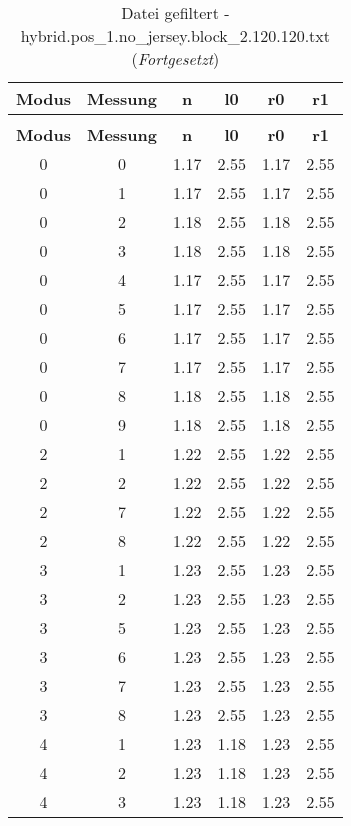 \begin{longtable}{|c|c||c||c||c|c|}
	\caption{Datei gefiltert - hybrid.pos\_1.no\_jersey.block\_2.120.120.txt} \label{tab:hybrid.pos-1.no-jersey.block-2.120.120.txt} \\ \hline
	\textbf{Modus} & \textbf{Messung} & \textbf{n} & \textbf{l0} & \textbf{r0} & \textbf{r1}\\ \hline
	\endfirsthead
	\caption[]{Datei gefiltert - hybrid.pos\_1.no\_jersey.block\_2.120.120.txt (\emph{Fortgesetzt})} \\ \hline
	\textbf{Modus} & \textbf{Messung} & \textbf{n} & \textbf{l0} & \textbf{r0} & \textbf{r1}\\ \hline
	\endhead
	0 & 0 & 1.17 & 2.55 & 1.17 & 2.55 \\ \hline
	0 & 1 & 1.17 & 2.55 & 1.17 & 2.55 \\ \hline
	0 & 2 & 1.18 & 2.55 & 1.18 & 2.55 \\ \hline
	0 & 3 & 1.18 & 2.55 & 1.18 & 2.55 \\ \hline
	0 & 4 & 1.17 & 2.55 & 1.17 & 2.55 \\ \hline
	0 & 5 & 1.17 & 2.55 & 1.17 & 2.55 \\ \hline
	0 & 6 & 1.17 & 2.55 & 1.17 & 2.55 \\ \hline
	0 & 7 & 1.17 & 2.55 & 1.17 & 2.55 \\ \hline
	0 & 8 & 1.18 & 2.55 & 1.18 & 2.55 \\ \hline
	0 & 9 & 1.18 & 2.55 & 1.18 & 2.55 \\ \hline
	2 & 1 & 1.22 & 2.55 & 1.22 & 2.55 \\ \hline
	2 & 2 & 1.22 & 2.55 & 1.22 & 2.55 \\ \hline
	2 & 7 & 1.22 & 2.55 & 1.22 & 2.55 \\ \hline
	2 & 8 & 1.22 & 2.55 & 1.22 & 2.55 \\ \hline
	3 & 1 & 1.23 & 2.55 & 1.23 & 2.55 \\ \hline
	3 & 2 & 1.23 & 2.55 & 1.23 & 2.55 \\ \hline
	3 & 5 & 1.23 & 2.55 & 1.23 & 2.55 \\ \hline
	3 & 6 & 1.23 & 2.55 & 1.23 & 2.55 \\ \hline
	3 & 7 & 1.23 & 2.55 & 1.23 & 2.55 \\ \hline
	3 & 8 & 1.23 & 2.55 & 1.23 & 2.55 \\ \hline
	4 & 1 & 1.23 & 1.18 & 1.23 & 2.55 \\ \hline
	4 & 2 & 1.23 & 1.18 & 1.23 & 2.55 \\ \hline
	4 & 3 & 1.23 & 1.18 & 1.23 & 2.55 \\ \hline

\end{longtable}

